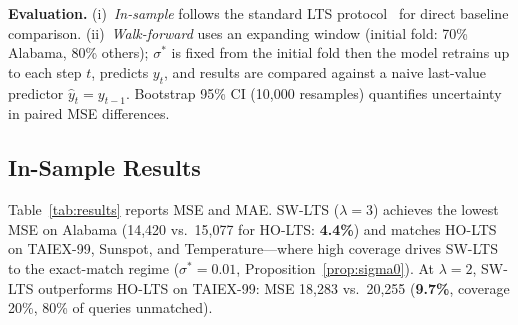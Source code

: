 \documentclass{llncs}
\begin{document}
\textbf{Evaluation.} (i)~\emph{In-sample} follows the standard LTS
protocol~\cite{hieu2020lts,hieu2021holts} for direct baseline
comparison. (ii)~\emph{Walk-forward} uses an expanding window
(initial fold: 70\% Alabama, 80\% others); $\sigma^*$ is fixed from
the initial fold then the model retrains up to each step $t$, predicts
$y_t$, and results are compared against a naive last-value predictor
$\hat{y}_t{=}y_{t-1}$. Bootstrap 95\% CI (10{,}000 resamples)
quantifies uncertainty in paired MSE differences.

\subsection{In-Sample Results}
\label{sec:results}

Table~\ref{tab:results} reports MSE and MAE. SW-LTS ($\lambda=3$)
achieves the lowest MSE on Alabama (14,420 vs.\ 15,077 for HO-LTS:
\textbf{4.4\%}) and matches HO-LTS on TAIEX-99, Sunspot, and
Temperature---where high coverage drives SW-LTS to the exact-match
regime ($\sigma^*=0.01$, Proposition~\ref{prop:sigma0}).
At $\lambda=2$, SW-LTS outperforms HO-LTS on TAIEX-99: MSE 18,283
vs.\ 20,255 (\textbf{9.7\%}, coverage 20\%, 80\% of queries unmatched).
\end{document}
